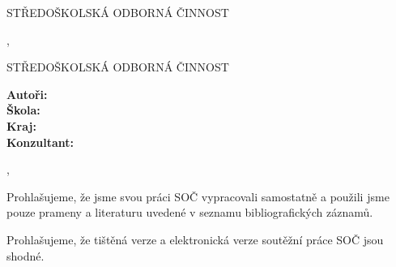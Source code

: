 \begin{titlepage}
  \bfseries{
    \begin{center}
      \LARGE{STŘEDOŠKOLSKÁ ODBORNÁ ČINNOST}

      \vspace{14pt}
      \large{
        \specialization
      }

      \vspace{0.4 \textheight}

      \LARGE{
        \mainTitle
      }
      \vspace{0.4 \textheight}
    \end{center}

    \noindent\Large{\authorName}

    \noindent\Large{\district {} \city, \publicationYear}
    }
\end{titlepage}

{\bfseries
  \begin{center}
    \LARGE{STŘEDOŠKOLSKÁ ODBORNÁ ČINNOST}

    \vspace{14pt}
    {\large
      \specialization
    }

    \vspace{0.3 \textheight}

    \LARGE{
      \mainTitle
    }

    \LARGE{    
      \mainTitleEN
    }

    \vspace{0.24\textheight}
  \end{center}
}
{\Large
  \noindent\textbf{Autoři:} \authorName\\
  \textbf{Škola:} \school\\
  \textbf{Kraj:} \district\\
  \textbf{Konzultant: } \consultant\\
}

\noindent \city, \publicationYear

\cleardoublepage


\noindent Prohlašujeme, že jsme svou práci SOČ vypracovali samostatně a použili jsme pouze prameny a literaturu uvedené v seznamu bibliografických záznamů.

\noindent Prohlašujeme, že tištěná verze a elektronická verze soutěžní práce SOČ jsou shodné. 

